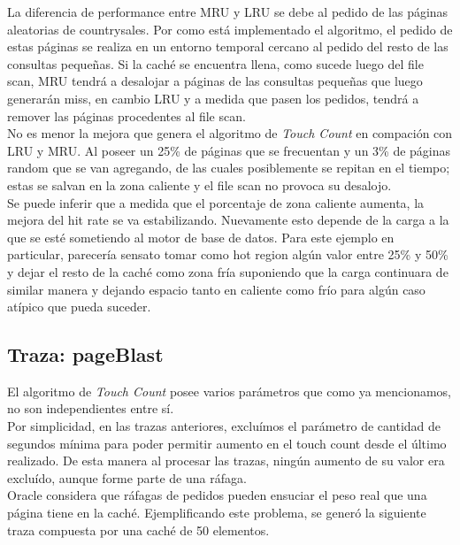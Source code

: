 \documentclass[11pt, a4paper, spanish]{article}
\begin{document}
La diferencia de performance entre MRU y LRU se debe al pedido de las p\'aginas aleatorias de countrysales. 
Por como est\'a implementado el algoritmo, el pedido de estas p\'aginas se realiza en un entorno temporal cercano 
al pedido del resto de las consultas peque\~{n}as. Si la cach\'e se encuentra llena, como sucede luego del file scan, 
MRU tendr\'a a desalojar a p\'aginas de las consultas peque\~{n}as que luego generar\'an miss, en cambio LRU y a medida
que pasen los pedidos, tendr\'a a remover las p\'aginas procedentes al file scan.\\

No es menor la mejora que genera el algoritmo de \textit{Touch Count} en compaci\'on con LRU y MRU. 
Al poseer un 25\% de p\'aginas que se frecuentan y un 3\% de p\'aginas random que se van agregando, 
de las cuales posiblemente se repitan en el tiempo; estas se salvan en la zona caliente y el file scan no provoca su desalojo.\\

Se puede inferir que a medida que el porcentaje de zona caliente aumenta, la mejora del hit rate se va estabilizando. 
Nuevamente esto depende de la carga a la que se est\'e sometiendo al motor de base de datos.
 Para este ejemplo en particular, parecer\'ia sensato tomar como hot region alg\'un valor entre 25\% y 50\% 
y dejar el resto de la cach\'e como zona fr\'ia suponiendo que la carga continuara de similar manera y dejando espacio tanto en caliente como fr\'io para alg\'un caso at\'ipico que pueda suceder.

\newpage
\subsection{Traza: pageBlast}

El algoritmo de \textit{Touch Count} posee varios par\'ametros que como ya mencionamos, no son independientes entre s\'i.\\

Por simplicidad, en las trazas anteriores, exclu\'imos el par\'ametro de cantidad de segundos m\'inima para poder permitir aumento en el touch count desde el \'ultimo realizado. De esta manera al procesar las trazas, ning\'un aumento de su valor era exclu\'ido, aunque forme parte de una r\'afaga.\\

Oracle considera que r\'afagas de pedidos pueden ensuciar el peso real que una p\'agina tiene en la cach\'e. Ejemplificando este problema, se gener\'o la siguiente traza compuesta por una cach\'e de 50 elementos.\\
\end{document}
